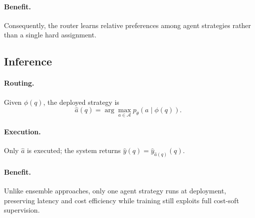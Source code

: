 \paragraph{Benefit.}
Consequently, the router learns relative preferences among agent strategies rather than a
single hard assignment.

\subsection{Inference}
\label{sec:method-inference}

\paragraph{Routing.}
Given $\phi(q)$, the deployed strategy is
\begin{equation}
  \hat{a}(q)=\arg\max_{a\in\mathcal{A}} p_\theta(a\mid\phi(q)).
  \label{eq:method-argmax}
\end{equation}

\paragraph{Execution.}
Only $\hat{a}$ is executed; the system returns $\hat{y}(q)=\hat{y}_{\hat{a}(q)}(q)$.

\paragraph{Benefit.}
Unlike ensemble approaches, only one agent strategy runs at deployment, preserving latency
and cost efficiency while training still exploits full cost-soft supervision.
